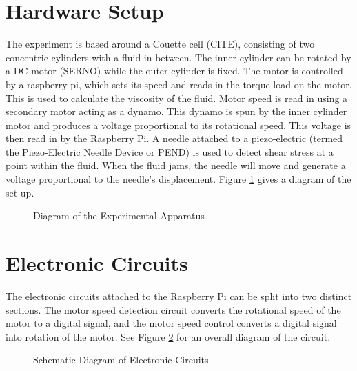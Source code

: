 \documentclass[twoside,a4]{report}
\def\rpi{Raspberry Pi}
\begin{document}
	\section{Hardware Setup} %
	The experiment is based around a Couette cell (CITE), consisting of two concentric cylinders with a fluid in between. The inner cylinder can be rotated by a DC motor (SERNO) while the outer cylinder is fixed. The motor is controlled by a raspberry pi, which sets its speed and reads in the torque load on the motor. This is used to calculate the viscosity of the fluid. 
	Motor speed is read in using a secondary motor acting as a dynamo. This dynamo is spun by the inner cylinder motor and produces a voltage proportional to its rotational speed. This voltage is then read in by the \rpi.
	A needle attached to a piezo-electric (termed the Piezo-Electric Needle Device or PEND) is used to detect shear stress at a point within the fluid. When the fluid jams, the needle will move and generate a voltage proportional to the needle's displacement. Figure \ref{expdia} gives a diagram of the set-up.\newline
	\begin{figure}[!htb]
	\centering
	\caption{Diagram of the Experimental Apparatus}
	\label{expdia}
	\end{figure} 
	
	\section{Electronic Circuits} %
	The electronic circuits attached to the Raspberry Pi can be split into two distinct sections. The motor speed detection circuit converts the rotational speed of the motor to a digital signal, and the motor speed control converts a digital signal into rotation of the motor. See Figure \ref{circfull} for an overall diagram of the circuit.
	\begin{figure}[!htb]
		\centering
		\caption{Schematic Diagram of Electronic Circuits}
		\label{circfull}
	\end{figure}
\end{document}
